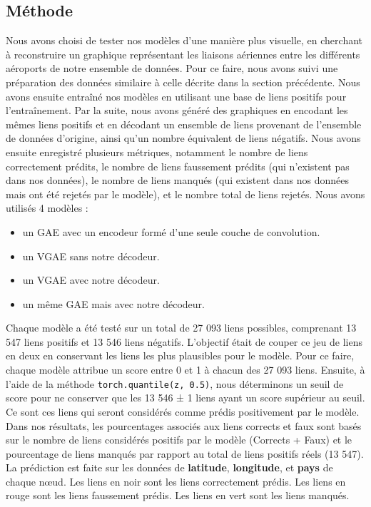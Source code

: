 \documentclass{article}
\begin{document}
\subsection{Méthode}
Nous avons choisi de tester nos modèles d'une manière plus visuelle, en cherchant à reconstruire un graphique représentant les liaisons aériennes entre les différents aéroports de notre ensemble de données. Pour ce faire, nous avons suivi une préparation des données similaire à celle décrite dans la section précédente. Nous avons ensuite entraîné nos modèles en utilisant une base de liens positifs pour l'entraînement. Par la suite, nous avons généré des graphiques en encodant les mêmes liens positifs et en décodant un ensemble de liens provenant de l'ensemble de données d'origine, ainsi qu'un nombre équivalent de liens négatifs. Nous avons ensuite enregistré plusieurs métriques, notamment le nombre de liens correctement prédits, le nombre de liens faussement prédits (qui n'existent pas dans nos données), le nombre de liens manqués (qui existent dans nos données mais ont été rejetés par le modèle), et le nombre total de liens rejetés.
Nous avons utilisés 4 modèles :
\begin{itemize}
    \item un GAE avec un encodeur formé d’une seule couche de convolution.
    \item un VGAE sans notre décodeur.
    \item un VGAE avec notre décodeur.
    \item un même GAE mais avec notre décodeur.
\end{itemize}

Chaque modèle a été testé sur un total de 27 093 liens possibles, comprenant 13 547 liens positifs et 13 546 liens négatifs. L'objectif était de couper ce jeu de liens en deux en conservant les liens les plus plausibles pour le modèle. Pour ce faire, chaque modèle attribue un score entre 0 et 1 à chacun des 27 093 liens. Ensuite, à l'aide de la méthode \texttt{torch.quantile(z, 0.5)}, nous déterminons un seuil de score pour ne conserver que les 13 546 ± 1 liens ayant un score supérieur au seuil. Ce sont ces liens qui seront considérés comme prédis positivement par le modèle. Dans nos résultats, les pourcentages associés aux liens corrects et faux sont basés sur le nombre de liens considérés positifs par le modèle (Corrects + Faux) et le pourcentage de liens manqués par rapport au total de liens positifs réels (13 547).
La prédiction est faite sur les données de \textbf{latitude}, \textbf{longitude},  et \textbf{pays} de chaque nœud.\newline
\newline
Les liens en noir sont les liens correctement prédis.\newline
Les liens en rouge sont les liens faussement prédis.\newline
Les liens en vert sont les liens manqués.
\end{document}
